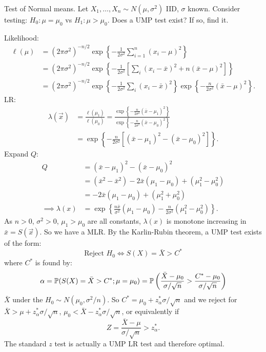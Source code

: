 \documentclass[10pt, a4paper]{article}
\begin{document}
\begin{example}
    Test of Normal means.
    Let $X_1, \dotsc, X_n \sim N(\mu, \sigma ^ 2)$ IID,
    $\sigma$ known.
    Consider testing:
    $H_0 : \mu = \mu_0$ vs $H_1 : \mu > \mu_0$.
    Does a UMP test exist?
    If so,
    find it.

    Likelihood:
    \begin{align*}
        \ell(\mu) &= (2\pi\sigma ^ 2) ^ {-n / 2}\exp\left\{-\frac{1}{2\sigma ^ 2}\sum_{i = 1}^{n}(x_i - \mu) ^ 2\right\} \\
        &= (2\pi\sigma ^ 2) ^ {-n / 2}\exp\left\{-\frac{1}{2\sigma ^ 2}\left[\sum_{i}(x_i - \bar{x}) ^ 2 + n(\bar{x} - \mu) ^ 2\right]\right\} \\
        &= (2\pi\sigma ^ 2) ^ {-n / 2}\exp\left\{-\frac{1}{2\sigma ^ 2}\sum_{i}(x_i - \bar{x}) ^ 2\right\}\exp\left\{-\frac{n}{2\sigma ^ 2}(\bar{x} - \mu) ^ 2\right\}.
    \end{align*}
    LR:
    \begin{align*}
        \lambda(\vec{x}) &= \frac{\ell(\mu_1)}{\ell(\mu_0)} = \frac{\exp\left\{-\frac{n}{2\sigma ^ 2}(\bar{x} - \mu_1) ^ 2\right\}}{\exp\left\{-\frac{n}{2\sigma ^ 2}(\bar{x} - \mu_0) ^ 2\right\}} \\
        &= \exp\left\{-\frac{n}{2\sigma ^ 2}\left[(\bar{x} - \mu_1) ^ 2 - (\bar{x} - \mu_0) ^ 2\right]\right\}.
    \end{align*}
    Expand $Q$:
    \begin{align*}
        Q &= (\bar{x} - \mu_1) ^ 2 - (\bar{x} - \mu_0) ^ 2 \\
        &= (\bar{x} ^ 2 - \bar{x} ^ 2) - 2\bar{x}(\mu_1 - \mu_0) + (\mu_1 ^ 2 - \mu_0 ^ 2) \\
        &= -2\bar{x}(\mu_1 - \mu_0) + (\mu_1 ^ 2 + \mu_0 ^ 2) \\
        \implies \lambda(x) &= \exp\left\{\frac{n\bar{x}}{\sigma ^ 2}(\mu_1 - \mu_0) - \frac{n}{2\sigma ^ 2}(\mu_1 ^ 2 - \mu_0 ^ 2)\right\}.
    \end{align*}
    As $n > 0$,
    $\sigma ^ 2 > 0$,
    $\mu_1 > \mu_0$ are all constants,
    $\lambda(x)$ is monotone increasing in $\bar{x} = S(\vec{x})$.
    So we have a MLR.
    By the Karlin-Rubin theorem,
    a UMP test exists of the form:
    \[
    \text{Reject $H_0$} \iff S(X) = \bar{X} > C ^ {*}
    \]
    where $C ^ {*}$ is found by:
    \[
    \alpha =  \P(S(X) = \bar{X} > C ^ {*}; \mu = \mu_0) = \P\left(\frac{\bar{X} - \mu_0}{\sigma / \sqrt{n}} > \frac{C ^ {*} - \mu_0}{\sigma / \sqrt{n}}\right)
    \]
    $\bar{X}$ under the $H_0 \sim N(\mu_0, \sigma ^ 2 / n)$.
    So $C ^ {*} = \mu_0 + z_{\alpha}^{*}\sigma / \sqrt{n}$ and we reject for $\bar{X} > \mu + z_{\alpha}^{*}\sigma / \sqrt{n}$,
    $\mu_0 < \bar{X} - z_{\alpha}^{*}\sigma / \sqrt{n}$,
    or equivalently if
    \[
    Z = \frac{\bar{X} - \mu}{\sigma / \sqrt{n}} > z_{\alpha}^{*}.
    \]
    The standard $z$ test is actually a UMP LR test and therefore optimal.
\end{example}
\end{document}
